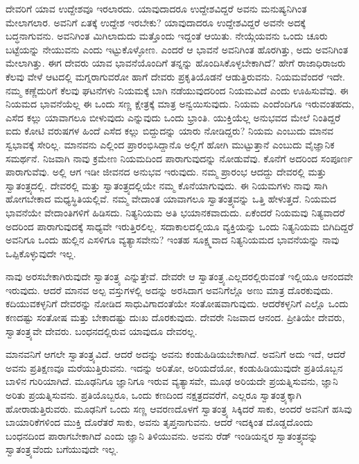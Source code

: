 ದೇವರಿಗೆ ಯಾವ ಉದ್ದೇಶವೂ ಇರಲಾರದು. ಯಾವುದಾದರೂ ಉದ್ದೇಶವಿದ್ದರೆ ಅವನು ಮನುಷ್ಯನಿಗಿಂತ ಮೇಲಾಗಲಾರ. ಅವನಿಗೆ ಏತಕ್ಕೆ ಉದ್ದೇಶ ಇರಬೇಕು? ಯಾವುದಾದರೂ ಉದ್ದೇಶವಿದ್ದರೆ ಅವನೇ ಅದಕ್ಕೆ ಬದ್ಧನಾಗುವನು. ಅವನಿಗಿಂತ ಮಿಗಿಲಾದುದು ಮತ್ತೊಂದು ಇದ್ದಂತೆ ಆಯಿತು. ನೇಯ್ಗೆಯವನು ಒಂದು ಚೂರು ಬಟ್ಟೆಯನ್ನು ನೇಯುವನು ಎಂದು ಇಟ್ಟುಕೊಳ್ಳೋಣ. ಎಂದರೆ ಆ ಭಾವನೆ ಅವನಿಗಿಂತ ಹೊರಗಿತ್ತು, ಅದು ಅವನಿಗಿಂತ ಮೇಲಾಗಿತ್ತು. ಈಗ ದೇವರು ಯಾವ ಭಾವನೆಯೊಂದಿಗೆ ತನ್ನನ್ನು ಹೊಂದಿಸಿಕೊಳ್ಳಬೇಕಾಗಿದೆ? ಹೇಗೆ ರಾಜಾಧಿರಾಜರು ಕೆಲವು ವೇಳೆ ಆಟದಲ್ಲಿ ಮಗ್ನರಾಗುವರೋ ಹಾಗೆ ದೇವರು ಪ್ರಕೃತಿಯೊಡನೆ ಆಡುತ್ತಿರುವನು. ನಿಯಮವೆಂದರೆ ಇದೇ. ನಮ್ಮ ಕಣ್ಣೆದುರಿಗೆ ಕೆಲವು ಘಟನೆಗಳು ನಿಯಮಕ್ಕೆ ಬಾಗಿ ನಡೆಯುವುದರಿಂದ ನಿಯಮವಿದೆ ಎಂದು ಊಹಿಸುವೆವು. ಈ ನಿಯಮದ ಭಾವನೆಯೆಲ್ಲ ಈ ಒಂದು ಸಣ್ಣ ಕ್ಷೇತ್ರಕ್ಕೆ ಮಾತ್ರ ಅನ್ವಯಿಸುವುದು. ನಿಯಮ ಎಂದೆಂದಿಗೂ ಇರುವಂತಹದು, ಎಸೆದ ಕಲ್ಲು ಯಾವಾಗಲೂ ಬೀಳುವುದು ಎನ್ನುವುದು ಒಂದು ಭ್ರಾಂತಿ. ಯುಕ್ತಿಯೆಲ್ಲ ಅನುಭವದ ಮೇಲೆ ನಿಂತಿದ್ದರೆ ಐದು ಕೋಟಿ ವರುಷಗಳ ಹಿಂದೆ ಎಸೆದ ಕಲ್ಲು ಬಿದ್ದುದನ್ನು ಯಾರು ನೋಡಿದ್ದರು? ನಿಯಮ ಎಂಬುದು ಮಾನವ ಸ್ವಭಾವಕ್ಕೆ ಸೇರಿಲ್ಲ. ಮಾನವನು ಎಲ್ಲಿಂದ ಪ್ರಾರಂಭಿಸಿದ್ದಾನೊ ಅಲ್ಲಿಗೆ ಹೋಗಿ ಮುಟ್ಟುತ್ತಾನೆ ಎಂಬುದು ವೈಜ್ಞಾನಿಕ ಸಮರ್ಥನೆ. ನಿಜವಾಗಿ ನಾವು ಕ್ರಮೇಣ ನಿಯಮದಿಂದ ಪಾರಾಗುವುದನ್ನು ನೋಡುವೆವು. ಕೊನೆಗೆ ಅದರಿಂದ ಸಂಪೂರ್ಣ ಪಾರಾಗುವೆವು. ಅಲ್ಲಿ ಆಗ ಇಡೀ ಜೀವನದ ಅನುಭವ ಇರುವುದು. ನಮ್ಮ ಪ್ರಾರಂಭ ಆದದ್ದು ದೇವರಲ್ಲಿ ಮತ್ತು ಸ್ವಾತಂತ್ರ್ಯದಲ್ಲಿ. ದೇವರಲ್ಲಿ ಮತ್ತು ಸ್ವಾತಂತ್ರ್ಯದಲ್ಲಿಯೇ ನಮ್ಮ ಕೊನೆಯಾಗುವುದು. ಈ ನಿಯಮಗಳು ನಾವು ಸಾಗಿ ಹೋಗಬೇಕಾದ ಮಧ್ಯಸ್ಥಿತಿಯಲ್ಲಿವೆ. ನಮ್ಮ ವೇದಾಂತ ಯಾವಾಗಲೂ ಸ್ವಾತಂತ್ರ್ಯವನ್ನು ಒತ್ತಿ ಹೇಳುತ್ತದೆ. ನಿಯಮದ ಭಾವನೆಯೇ ವೇದಾಂತಿಗಳಿಗೆ ಹಿಡಿಸದು. ನಿತ್ಯನಿಯಮ ಅತಿ ಭಯಾನಕವಾದುದು. ಏಕೆಂದರೆ ನಿಯಮವು ನಿತ್ಯವಾದರೆ ಅದರಿಂದ ಪಾರಾಗುವುದಕ್ಕೆ ಸಾಧ್ಯವೇ ಇರುತ್ತಿರಲಿಲ್ಲ. ಸದಾಕಾಲದಲ್ಲಿಯೂ ವ್ಯಕ್ತಿಯನ್ನು ಒಂದು ನಿತ್ಯನಿಯಮ ಬಿಗಿದಿದ್ದರೆ ಅವನಿಗೂ ಒಂದು ಹುಲ್ಲಿನ ಎಸಳಿಗೂ ವ್ಯತ್ಯಾಸವೇನು? ಇಂತಹ ಸೂಕ್ಷ್ಮವಾದ ನಿತ್ಯನಿಯಮದ ಭಾವನೆಯನ್ನು ನಾವು ಒಪ್ಪಿಕೊಳ್ಳುವುದೇ ಇಲ್ಲ.

\vskip 6pt

ನಾವು ಅರಸಬೇಕಾಗಿರುವುದೇ ಸ್ವಾತಂತ್ರ್ಯ ಎನ್ನುತ್ತೇವೆ. ದೇವರೇ ಆ ಸ್ವಾತಂತ್ರ್ಯ.\break ಎಲ್ಲದರಲ್ಲಿರುವಂತೆ ಇಲ್ಲಿಯೂ ಆನಂದವೇ ಇರುವುದು. ಆದರೆ ಮಾನವ ಅಲ್ಪ ವಸ್ತುಗಳಲ್ಲಿ ಅದನ್ನು ಅರಸಿದಾಗ ಅವನಿಗೆಲ್ಲೊ ಅಣು ಮಾತ್ರ ದೊರಕುವುದು. ಕದಿಯುವ\break ಕಳ್ಳನಿಗೆ ದೇವರನ್ನು ನೋಡಿದ ಸಾಧುವಿಗಾದಂತೆಯೇ ಸಂತೋಷವಾಗುವುದು. ಆದರೆ\break ಕಳ್ಳನಿಗೆ ಎಲ್ಲೊ ಒಂದು ಕಣದಷ್ಟು ಸಂತೋಷ ಮತ್ತು ಬೇಕಾದಷ್ಟು ದುಃಖ ದೊರಕುವುದು. ದೇವರೇ ನಿಜವಾದ ಆನಂದ. ಪ್ರೀತಿಯೇ ದೇವರು, ಸ್ವಾತಂತ್ರ್ಯವೇ ದೇವರು. ಬಂಧನದಲ್ಲಿರುವ ಯಾವುದೂ ದೇವರಲ್ಲ.

\vskip 6pt

ಮಾನವನಿಗೆ ಆಗಲೇ ಸ್ವಾತಂತ್ರ್ಯವಿದೆ. ಆದರೆ ಅದನ್ನು ಅವನು ಕಂಡುಹಿಡಿಯ\break ಬೇಕಾಗಿದೆ. ಅವನಿಗೆ ಅದು ಇದೆ, ಆದರೆ ಅವನು ಪ್ರತಿಕ್ಷಣವೂ ಮರೆಯುತ್ತಿರುವನು. ಇದನ್ನು ಅರಿತೋ, ಅರಿಯದೆಯೋ, ಕಂಡುಹಿಡಿಯುವುದೇ ಪ್ರತಿಯೊಬ್ಬನ ಬಾಳಿನ ಗುರಿಯಾಗಿದೆ. ಮೂಢನಿಗೂ ಜ್ಞಾನಿಗೂ ಇರುವ ವ್ಯತ್ಯಾಸವೇ, ಮೂಢ ಅರಿಯದೇ ಪ್ರಯತ್ನಿಸುವನು, ಜ್ಞಾನಿ ಅರಿತು ಪ್ರಯತ್ನಿಸುವನು. ಪ್ರತಿಯೊಬ್ಬರೂ, ಒಂದು ಕಣದಿಂದ ನಕ್ಷತ್ರದವರೆಗೆ, ಎಲ್ಲರೂ ಸ್ವಾತಂತ್ರ್ಯಕ್ಕಾಗಿ ಹೋರಾಡುತ್ತಿರುವರು. ಮೂಢನಿಗೆ ಒಂದು ಸಣ್ಣ ಆವರಣದೊಳಗೆ ಸ್ವಾತಂತ್ರ್ಯ ಸಿಕ್ಕಿದರೆ ಸಾಕು, ಅಂದರೆ ಅವನಿಗೆ ಹಸಿವು ಬಾಯಾರಿಕೆಗಳಿಂದ ಮುಕ್ತಿ ದೊರೆತರೆ ಸಾಕು, ಅವನು ತೃಪ್ತನಾಗುವನು. ಆದರೆ ಇದಕ್ಕಿಂತ ದೊಡ್ಡದೊಂದು ಬಂಧನದಿಂದ ಪಾರಾಗಬೇಕಾಗಿದೆ ಎಂದು ಜ್ಞಾನಿ ತಿಳಿಯುವನು. ಅವನು ರೆಡ್​ ಇಂಡಿಯನ್ನರ ಸ್ವಾತಂತ್ರ್ಯವನ್ನು ಸ್ವಾತಂತ್ರ್ಯವೆಂದು ಬಗೆಯುವುದೇ ಇಲ್ಲ.

